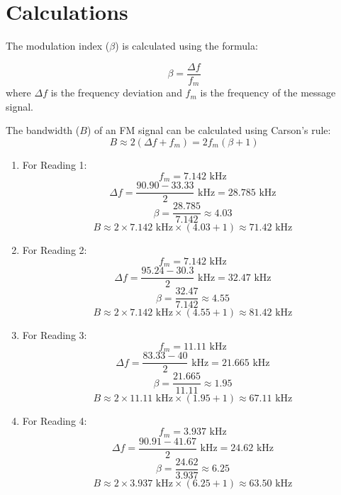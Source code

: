 \documentclass[12pt]{article}
\begin{document}
\section*{Calculations}
The modulation index (\( \beta \)) is calculated using the formula:

\[
    \beta = \frac{\Delta f}{f_m}
\]
where \( \Delta f \) is the frequency deviation and \( f_m \) is the frequency of the message signal.

The bandwidth (\( B \)) of an FM signal can be calculated using Carson's rule:
\[
    B \approx 2 (\Delta f + f_m) = 2 f_m (\beta + 1)
\]

\begin{enumerate}
    \item For Reading 1:
          \[
              f_m = 7.142 \text{ kHz}
          \]
          \[
              \Delta f = \frac{90.90 - 33.33}{2} \text{ kHz} = 28.785 \text{ kHz}
          \]
          \[
              \beta = \frac{28.785}{7.142} \approx 4.03
          \]
          \[
              B \approx 2 \times 7.142 \text{ kHz} \times (4.03 + 1) \approx 71.42 \text{ kHz}
          \]

    \item For Reading 2:
          \[
              f_m = 7.142 \text{ kHz}
          \]
          \[
              \Delta f = \frac{95.24 - 30.3}{2} \text{ kHz} = 32.47 \text{ kHz}
          \]
          \[
              \beta = \frac{32.47}{7.142} \approx 4.55
          \]
          \[
              B \approx 2 \times 7.142 \text{ kHz} \times (4.55 + 1) \approx 81.42 \text{ kHz}
          \]

    \item For Reading 3:
          \[
              f_m = 11.11 \text{ kHz}
          \]
          \[
              \Delta f = \frac{83.33 - 40}{2} \text{ kHz} = 21.665 \text{ kHz}
          \]
          \[
              \beta = \frac{21.665}{11.11} \approx 1.95
          \]
          \[
              B \approx 2 \times 11.11 \text{ kHz} \times (1.95 + 1) \approx 67.11 \text{ kHz}
          \]

    \item For Reading 4:
          \[
              f_m = 3.937 \text{ kHz}
          \]
          \[
              \Delta f = \frac{90.91 - 41.67}{2} \text{ kHz} = 24.62 \text{ kHz}
          \]
          \[
              \beta = \frac{24.62}{3.937} \approx 6.25
          \]
          \[
              B \approx 2 \times 3.937 \text{ kHz} \times (6.25 + 1) \approx 63.50 \text{ kHz}
          \]
\end{enumerate}
\end{document}
